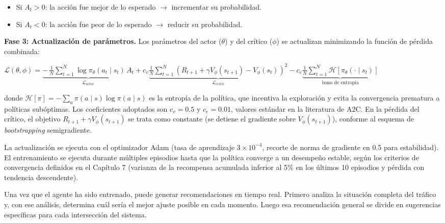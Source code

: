 \documentclass[12pt,a4paper,oneside]{report}
\newenvironment{centeredmath}
  {\begin{center}\begin{adjustbox}{max width=0.96\linewidth}\(\displaystyle}
  {\)\end{adjustbox}\end{center}}
\begin{document}
\begin{itemize}
\item
  Si \(A_{t} > 0\): la acción fue mejor de lo esperado \(\rightarrow\) incrementar su probabilidad.
\item
  Si \(A_{t} < 0\): la acción fue peor de lo esperado \(\rightarrow\) reducir su probabilidad.
\end{itemize}

\textbf{Fase 3: Actualización de parámetros.} Los parámetros del actor (\(\theta\)) y del crítico (\(\phi\)) se actualizan minimizando la función de pérdida combinada:

\begin{centeredmath}
\mathcal{L}(\theta, \phi) = \underbrace{-\,\frac{1}{N}\sum_{t = 1}^{N}\log \pi_{\theta}(a_{t} \mid s_{t})\, A_{t}}_{\mathcal{L}_{actor}}
+ c_{v}\underbrace{\frac{1}{N}\sum_{t = 1}^{N}\left(R_{t+1} + \gamma V_{\phi}(s_{t+1}) - V_{\phi}(s_{t})\right)^{2}}_{\mathcal{L}_{critic}}
- c_{e}\underbrace{\frac{1}{N}\sum_{t = 1}^{N}\mathcal{H}\!\left[\pi_{\theta}(\cdot \mid s_{t})\right]}_{\text{bono de entropía}}
\end{centeredmath}

donde \(\mathcal{H}[\pi] = -\sum_{a}\pi(a \mid s)\log\pi(a \mid s)\) es la entropía de la política, que incentiva la exploración y evita la convergencia prematura a políticas subóptimas. Los coeficientes adoptados son \(c_{v} = 0.5\) y \(c_{e} = 0.01\), valores estándar en la literatura de A2C. En la pérdida del crítico, el objetivo \(R_{t+1} + \gamma V_{\phi}(s_{t+1})\) se trata como constante (se detiene el gradiente sobre \(V_{\phi}(s_{t+1})\)), conforme al esquema de \emph{bootstrapping} semigradiente.

La actualización se ejecuta con el optimizador Adam (tasa de aprendizaje \(3 \times 10^{-4}\), recorte de norma de gradiente en 0.5 para estabilidad). El entrenamiento se ejecuta durante múltiples episodios hasta que la política converge a un desempeño estable, según los criterios de convergencia definidos en el Capítulo 7 (varianza de la recompensa acumulada inferior al 5\% en los últimos 10 episodios y pérdida con tendencia descendente).

Una vez que el agente ha sido entrenado, puede generar recomendaciones en tiempo real. Primero analiza la situación completa del tráfico y, con ese análisis, determina cuál sería el mejor ajuste posible en cada momento. Luego esa recomendación general se divide en sugerencias específicas para cada intersección del sistema.
\end{document}
